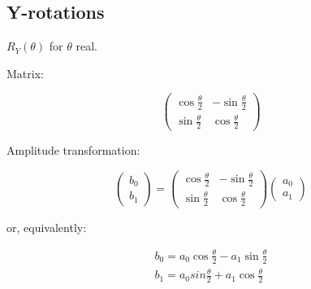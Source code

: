 \documentclass[11pt, letterpaper]{article}
\begin{document}
\newpage

\subsection{Y-rotations}
$R_Y(\theta)$ for $\theta$ real.

Matrix:

\begin{equation}
	\begin{pmatrix} \cos\frac{\theta}{2} & -\sin\frac{\theta}{2}\\  \sin\frac{\theta}{2} &  \cos\frac{\theta}{2} \end{pmatrix}
\end{equation}

Amplitude transformation:

\begin{equation}
	\begin{pmatrix}b_0 \\ b_1 \end{pmatrix} =
	\begin{pmatrix} \cos\frac{\theta}{2} & -\sin\frac{\theta}{2}\\  \sin\frac{\theta}{2} &  \cos\frac{\theta}{2} \end{pmatrix}
	\begin{pmatrix} a_0 \\ a_1 \end{pmatrix}
\end{equation}

or, equivalently:

\begin{eqnarray*}
	 b_0 = a_0\cos\frac{\theta}{2} - a_1\sin\frac{\theta}{2} \\
	 b_1 = a_0sin\frac{\theta}{2} + a_1\cos\frac{\theta}{2}
\end{eqnarray*}
\end{document}
